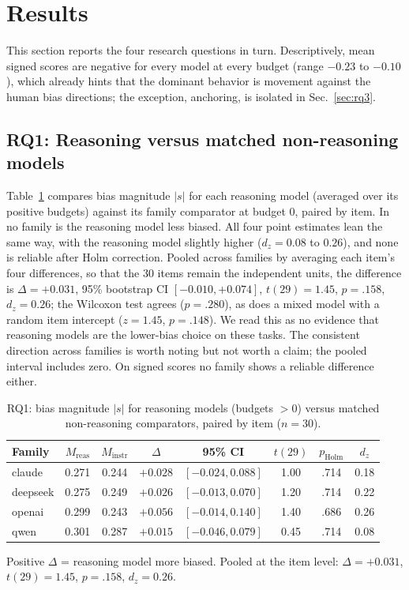 \documentclass[conference]{IEEEtran}
\begin{document}
\section{Results}

This section reports the four research questions in turn. Descriptively, mean signed scores are negative for every model at every budget (range $-0.23$ to $-0.10$), which already hints that the dominant behavior is movement against the human bias directions; the exception, anchoring, is isolated in Sec.~\ref{sec:rq3}.

\subsection{RQ1: Reasoning versus matched non-reasoning models}
Table~\ref{tab:rq1} compares bias magnitude $|s|$ for each reasoning model (averaged over its positive budgets) against its family comparator at budget 0, paired by item. In no family is the reasoning model less biased. All four point estimates lean the same way, with the reasoning model slightly higher ($d_z = 0.08$ to $0.26$), and none is reliable after Holm correction. Pooled across families by averaging each item's four differences, so that the 30 items remain the independent units, the difference is $\Delta = +0.031$, 95\% bootstrap CI $[-0.010, +0.074]$, $t(29) = 1.45$, $p = .158$, $d_z = 0.26$; the Wilcoxon test agrees ($p = .280$), as does a mixed model with a random item intercept ($z = 1.45$, $p = .148$). We read this as no evidence that reasoning models are the lower-bias choice on these tasks. The consistent direction across families is worth noting but not worth a claim; the pooled interval includes zero. On signed scores no family shows a reliable difference either.

\begin{table}[!t]
\centering
\caption{RQ1: bias magnitude $|s|$ for reasoning models (budgets $>0$) versus matched non-reasoning comparators, paired by item ($n=30$).}
\label{tab:rq1}
\footnotesize
\setlength{\tabcolsep}{2.6pt}
\begin{tabular}{lccccccc}
\hline
Family & $M_{\text{reas}}$ & $M_{\text{instr}}$ & $\Delta$ & 95\% CI & $t(29)$ & $p_{\text{Holm}}$ & $d_z$ \\
\hline
claude   & 0.271 & 0.244 & $+0.028$ & $[-0.024, 0.088]$ & 1.00 & .714 & 0.18 \\
deepseek & 0.275 & 0.249 & $+0.026$ & $[-0.013, 0.070]$ & 1.20 & .714 & 0.22 \\
openai   & 0.299 & 0.243 & $+0.056$ & $[-0.014, 0.140]$ & 1.40 & .686 & 0.26 \\
qwen     & 0.301 & 0.287 & $+0.015$ & $[-0.046, 0.079]$ & 0.45 & .714 & 0.08 \\
\hline
\end{tabular}
\par\smallskip\footnotesize Positive $\Delta$ = reasoning model more biased. Pooled at the item level: $\Delta = +0.031$, $t(29)=1.45$, $p=.158$, $d_z=0.26$.
\end{table}
\end{document}
